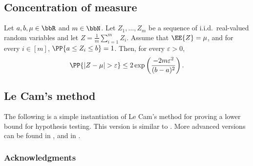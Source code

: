 %
\subsection{Concentration of measure}  %

\begin{theorem}
	\label{theorem:hoeffding}
	Let $a,b,\mu \in \bbR$ and $m \in \bbN$. Let $Z_1, \dots, Z_m$ be a sequence of i.i.d.\ real-valued random variables and let $Z=\frac{1}{m} \sum_{i=1}^m Z_i$. Assume that $\EE{Z}=\mu$, and for every $i \in [m]$, $\PP{a \leq Z_i \leq b}=1$. Then, for every $\varepsilon>0$,
	\[
		\PP{\left|Z-\mu\right|>\varepsilon} \leq 2 \exp\left(\frac{-2 m \varepsilon^2}{(b-a)^2}\right).
	\]
\end{theorem}

%
\subsection{Le Cam's method}  %

The following is a simple instantiation of Le Cam's method for proving a lower bound for hypothesis testing. This version is similar to
%
\cite[Proposition 2.3.1]{stats311_notes}.  %
More advanced versions can be found in
%
\cite[Lemma 1]{yu1997assouad},  %
and in %
\cite[Chapter 16]{lecam1986asymptotic}.  %

%


\subsubsection*{Acknowledgments}

